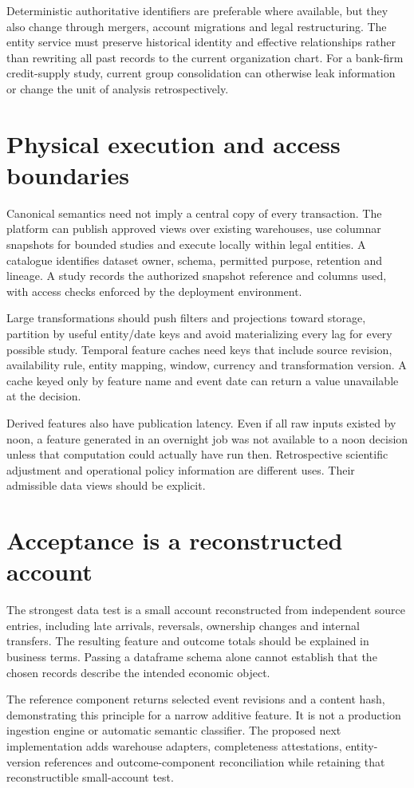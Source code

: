 Deterministic authoritative identifiers are preferable where available,
but they also change through mergers, account migrations and legal
restructuring. The entity service must preserve historical identity and
effective relationships rather than rewriting all past records to the
current organization chart. For a bank-firm credit-supply study, current
group consolidation can otherwise leak information or change the unit
of analysis retrospectively.

\section{Physical execution and access boundaries}
Canonical semantics need not imply a central copy of every transaction.
The platform can publish approved views over existing warehouses, use
columnar snapshots for bounded studies and execute locally within legal
entities. A catalogue identifies dataset owner, schema, permitted purpose,
retention and lineage. A study records the authorized snapshot reference
and columns used, with access checks enforced by the deployment environment.

Large transformations should push filters and projections toward storage,
partition by useful entity/date keys and avoid materializing every lag
for every possible study. Temporal feature caches need keys that include
source revision, availability rule, entity mapping, window, currency and
transformation version. A cache keyed only by feature name and event date
can return a value unavailable at the decision.

Derived features also have publication latency. Even if all raw inputs
existed by noon, a feature generated in an overnight job was not available
to a noon decision unless that computation could actually have run then.
Retrospective scientific adjustment and operational policy information are
different uses. Their admissible data views should be explicit.

\section{Acceptance is a reconstructed account}
The strongest data test is a small account reconstructed from independent
source entries, including late arrivals, reversals, ownership changes and
internal transfers. The resulting feature and outcome totals should be
explained in business terms. Passing a dataframe schema alone cannot
establish that the chosen records describe the intended economic object.

The reference component returns selected event revisions and a content hash,
demonstrating this principle for a narrow additive feature. It is not a
production ingestion engine or automatic semantic classifier. The proposed
next implementation adds warehouse adapters, completeness attestations,
entity-version references and outcome-component reconciliation while
retaining that reconstructible small-account test.
